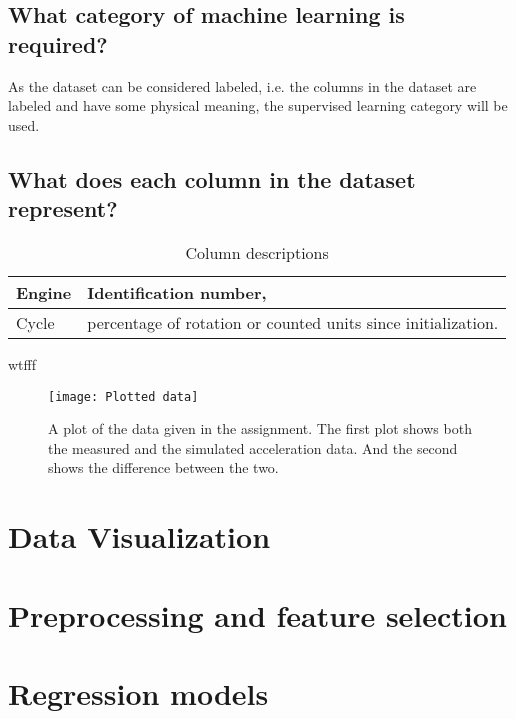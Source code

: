 \documentclass[%
oneside,    %
project,    %
nosummary   %
]{USN-MSc}
\begin{document}
\section{What category of machine learning is required?}
\label{sec:mlCategory}
As the dataset can be considered labeled, i.e. the columns in the dataset are labeled and have some physical meaning, the supervised learning category will be used.

\section{What does each column in the dataset represent?}
\label{sec:datasetColumns}

\begin{table}[!ht]
  \caption{Column descriptions}
  \centering
  \begin{tabular}{ | m{3cm} | m{10cm} |}
    \hline
    Engine & Identification number,                                        \\ \hline
    Cycle  & percentage of rotation or counted units since initialization. \\ \hline
  \end{tabular}
  \label{tab:columnDescr}
\end{table}


wtfff

\begin{figure}[!ht]
  \centering
  \texttt{[image: Plotted data]}
  \caption{
    A plot of the data given in the assignment.
    The first plot shows both the measured and the simulated acceleration data.
    And the second shows the difference between the two.}
  \label{fig:raw_data_plot}
\end{figure}

\chapter{Data Visualization}
\label{ch:visualization}
\lipsum[1]

\chapter{Preprocessing and feature selection}
\label{ch:preprocessing}
\lipsum[1]

\chapter{Regression models}
\label{ch:regression}
\lipsum[1]
\end{document}
